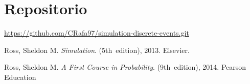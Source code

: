 \documentclass[a4paper,10pt,twocolumn]{article}
\begin{document}
\section{Repositorio}\label{sec:conc}

	\href{https://github.com/CRafa97/simulation-discrete-events.git}{https://github.com/CRafa97/simulation-discrete-events.git}


\begin{thebibliography}{99}
	 Ross, Sheldon M. \emph{Simulation}.
		(5th~edition), 2013.
		Elsevier.
		
	 Ross, Sheldon M. \emph{A First Course in Probability}.
		(9th~edition), 2014.
		Pearson Education

\end{thebibliography}


\label{end}
\end{document}
